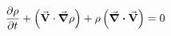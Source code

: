 \begin{equation}
  \pdv{\rho}{t} 
  + \left(\va{V}\cdot\grad\rho\right)
  + \rho\left(\div{\va{V}}\right) = 0
\end{equation}

